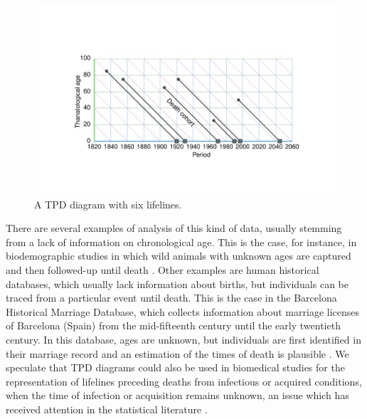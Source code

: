 \documentclass[12pt,oneside,a4paper]{article} %
\begin{document}
\begin{figure}[h!] 
\caption{A TPD diagram with six lifelines.}
\label{fig:TPD}
\centering
\includegraphics[scale=0.8]{Figures/TPDrt.pdf}
\end{figure} 
There are several examples of analysis of this kind of data, usually stemming
from a lack of information on chronological age. This is the case, for instance,
in biodemographic studies in which wild animals with unknown ages are captured
and then followed-up until death \cite{muller2004demographic,
muller2007survival}. Other examples are human historical databases, which
usually lack information about births, but individuals can be traced from a
particular event until death. This is the case in the Barcelona Historical
Marriage Database, which collects information about marriage licenses of
Barcelona (Spain) from the mid-fifteenth century until the early twentieth
century. In this database, ages are unknown, but individuals are first
identified in their marriage record and an estimation of the times of death is
plausible \citep{villavicencio2015reconstructing}. We speculate that TPD
diagrams could also be used in biomedical studies for the representation of
lifelines preceding deaths from infectious or acquired conditions, when the time
of infection or acquisition remains unknown, an issue which has received
attention in the statistical literature \citep[see e.g.][]{chan2010backward}.
\end{document}
